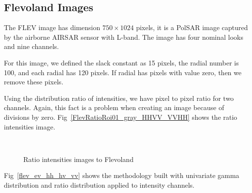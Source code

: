 \documentclass[remotesensing,article,submit,pdftex,moreauthors]{Definitions/mdpi}
\begin{document}
\subsection{Flevoland Images} 
The FLEV image has dimension $750\times 1024$ pixels, it is a PolSAR image captured by the airborne AIRSAR sensor with L-band. The image has four nominal looks and nine channels. 

For this image, we defined the slack constant as 15 pixels, the radial number is 100, and each radial has 120 pixels. If radial has pixels with value zero, then we remove these pixels.  

Using the distribution ratio of intensities, we have pixel to pixel ratio for two channels. Again, this fact is a problem when creating an image because of divisions by zero. Fig~\eqref{FlevRatioRoi01_gray_HHVV_VVHH} shows the ratio intensities image.   
\begin{figure}[hbt]
	\centering
     \\
     \caption{Ratio intensities images to Flevoland}
     \label{FlevRatioRoi01_gray_HHVV_VVHH} 
   \end{figure}
%

Fig~\eqref{flev_ev_hh_hv_vv} shows the methodology built with univariate gamma distribution and ratio distribution applied to  intensity channels.
\end{document}
